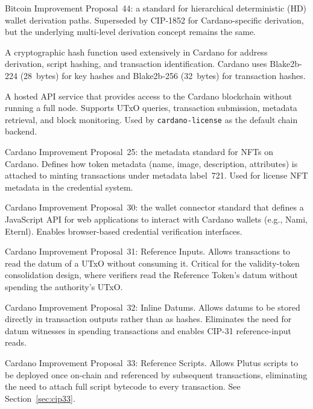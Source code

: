 \begin{description}[style=nextline, leftmargin=2.5cm, labelwidth=2.3cm]
\item[BIP-44]
  Bitcoin Improvement Proposal~44: a standard for hierarchical deterministic
  (HD) wallet derivation paths.  Superseded by CIP-1852 for Cardano-specific
  derivation, but the underlying multi-level derivation concept remains the
  same.

\item[Blake2b]
  A cryptographic hash function used extensively in Cardano for address
  derivation, script hashing, and transaction identification.  Cardano uses
  Blake2b-224 (28~bytes) for key hashes and Blake2b-256 (32~bytes) for
  transaction hashes.

\item[Blockfrost]
  A hosted API service that provides access to the Cardano blockchain without
  running a full node.  Supports UTxO queries, transaction submission,
  metadata retrieval, and block monitoring.  Used by \texttt{cardano-license}
  as the default chain backend.

\item[CIP-25]
  Cardano Improvement Proposal~25: the metadata standard for NFTs on
  Cardano.  Defines how token metadata (name, image, description, attributes)
  is attached to minting transactions under metadata label~721.  Used for
  license NFT metadata in the credential system.

\item[CIP-30]
  Cardano Improvement Proposal~30: the wallet connector standard that defines
  a JavaScript API for web applications to interact with Cardano wallets
  (e.g., Nami, Eternl).  Enables browser-based credential verification
  interfaces.

\item[CIP-31]
  Cardano Improvement Proposal~31: Reference Inputs.  Allows transactions to
  read the datum of a UTxO without consuming it.  Critical for the
  validity-token consolidation design, where verifiers read the Reference
  Token's datum without spending the authority's UTxO.

\item[CIP-32]
  Cardano Improvement Proposal~32: Inline Datums.  Allows datums to be
  stored directly in transaction outputs rather than as hashes.  Eliminates
  the need for datum witnesses in spending transactions and enables CIP-31
  reference-input reads.

\item[CIP-33]
  Cardano Improvement Proposal~33: Reference Scripts.  Allows Plutus
  scripts to be deployed once on-chain and referenced by subsequent
  transactions, eliminating the need to attach full script bytecode to every
  transaction.  See Section~\ref{sec:cip33}.


\end{description}
